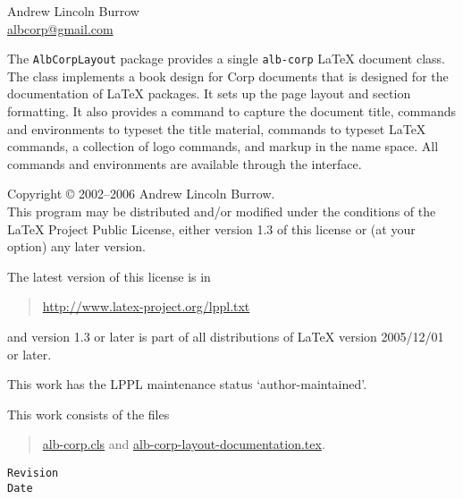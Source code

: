 \documentclass[11pt,a4paper,oneside,titlepage]{alb-corp}
\begin{document}



\begin{albTitlePage}


  Andrew Lincoln Burrow\\
  \url{albcorp@gmail.com}



  The \texttt{AlbCorpLayout} package provides a single \texttt{alb-corp}
  \LaTeX{} document class.  The class implements a book design for
  \albLogo{}Corp documents that is designed for the documentation of
  \LaTeX{} packages.  It sets up the page layout and section formatting.
  It also provides a command to capture the document title, commands and
  environments to typeset the title material, commands to typeset
  \LaTeX{} commands, a collection of logo commands, and markup in the
  \albLogo{} name space.  All commands and environments are available
  through the \AUCTeX{} interface.



  Copyright \copyright{} 2002--2006 Andrew Lincoln Burrow.\\
  This program may be distributed and/or modified under the conditions
  of the \LaTeX{} Project Public License, either version 1.3 of this
  license or (at your option) any later version.

  \medskip{}

  The latest version of this license is in
  \begin{quote}
    \url{http://www.latex-project.org/lppl.txt}
  \end{quote}
  and version 1.3 or later is part of all distributions of LaTeX version
  2005/12/01 or later.

  \medskip{}

  This work has the LPPL maintenance status `author-maintained'.

  \medskip{}

  This work consists of the files
  \begin{quote}
    \begin{flushleft}
      \url{alb-corp.cls} and \url{alb-corp-layout-documentation.tex}.
    \end{flushleft}
  \end{quote}



  \verb$Revision$\\
  \verb$Date$

\end{albTitlePage}
\end{document}
